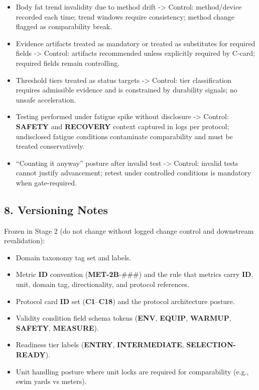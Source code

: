 \documentclass[10pt]{article}
\begin{document}
\begin{itemize}
\item Body fat trend invalidity due to method drift -> Control: method/device recorded each time; trend windows require consistency; method change flagged as comparability break.
\item Evidence artifacts treated as mandatory or treated as substitutes for required fields -> Control: artifacts recommended unless explicitly required by C-card; required fields remain controlling.
\item Threshold tiers treated as status targets -> Control: tier classification requires admissible evidence and is constrained by durability signals; no unsafe acceleration.
\item Testing performed under fatigue spike without disclosure -> Control: \textbf{SAFETY} and \textbf{RECOVERY} context captured in logs per protocol; undisclosed fatigue conditions contaminate comparability and must be treated conservatively.
\item “Counting it anyway” posture after invalid test -> Control: invalid tests cannot justify advancement; retest under controlled conditions is mandatory when gate-required.
\end{itemize}

\subsection*{8. Versioning Notes}

Frozen in Stage 2 (do not change without logged change control and downstream revalidation):

\begin{itemize}
\item Domain taxonomy tag set and labels.
\item Metric \textbf{ID} convention (\textbf{MET-2B}-\#\#\#) and the rule that metrics carry \textbf{ID}, unit, domain tag, directionality, and protocol references.
\item Protocol card \textbf{ID} set (\textbf{C1}–\textbf{C18}) and the protocol architecture posture.
\item Validity condition field schema tokens (\textbf{ENV}, \textbf{EQUIP}, \textbf{WARMUP}, \textbf{SAFETY}, \textbf{MEASURE}).
\item Readiness tier labels (\textbf{ENTRY}, \textbf{INTERMEDIATE}, \textbf{SELECTION-READY}).
\item Unit handling posture where unit locks are required for comparability (e.g., swim yards vs meters).
\end{itemize}
\end{document}
